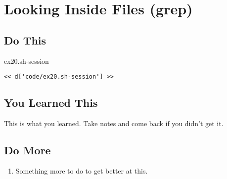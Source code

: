 \chapter{Looking Inside Files (grep)}

\section{Do This}

\begin{code}{ex20.sh-session}
\begin{Verbatim}
<< d['code/ex20.sh-session'] >>
\end{Verbatim}
\end{code}


\section{You Learned This}

This is what you learned.  Take notes and come back if you didn't get it.

\section{Do More}

\begin{enumerate}
\item Something more to do to get better at this.
\end{enumerate}

